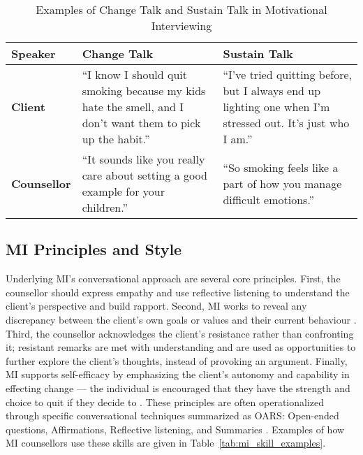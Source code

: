 \begin{table}[ht!]
\centering
\begin{tabular}{@{} p{} p{} p{} @{}}
\toprule
\textbf{Speaker} & \textbf{Change Talk} & \textbf{Sustain Talk} \\
\midrule
\textbf{Client} & 
``I know I should quit smoking because my kids hate the smell, and I don’t want them to pick up the habit.'' & 
``I’ve tried quitting before, but I always end up lighting one when I’m stressed out. It’s just who I am.'' \\
\addlinespace
\textbf{Counsellor} & 
``It sounds like you really care about setting a good example for your children.'' & 
``So smoking feels like a part of how you manage difficult emotions.'' \\
\bottomrule
\end{tabular}
\caption{Examples of Change Talk and Sustain Talk in Motivational Interviewing}
\label{tab:change_sustain_talk}
\end{table}



\subsection{MI Principles and Style}
Underlying MI's conversational approach are several core principles. First, the counsellor should express empathy and use reflective listening to understand the client's perspective and build rapport. Second, MI works to reveal any discrepancy between the client's own goals or values and their current behaviour \cite{MillerRollnick2013}. Third, the counsellor acknowledges the client's resistance rather than confronting it; resistant remarks are met with understanding and are used as opportunities to further explore the client's thoughts, instead of provoking an argument. Finally, MI supports self-efficacy by emphasizing the client's autonomy and capability in effecting change --- the individual is encouraged that they have the strength and choice to quit if they decide to \cite{MillerRollnick2013}. These principles are often operationalized through specific conversational techniques summarized as OARS: Open-ended questions, Affirmations, Reflective listening, and Summaries \cite{Rollnick1995}.  Examples of how MI counsellors use these skills are given in Table~\ref{tab:mi_skill_examples}.



